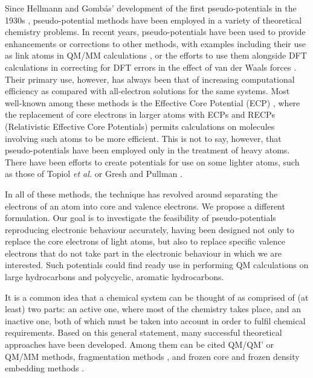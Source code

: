 \documentclass[12pt]{article}
\begin{document}
Since Hellmann and Gomb\'as' development of the first pseudo-potentials in the 1930s \cite{hellmann_1935, gombas_1935}, pseudo-potential methods have been employed in a variety of theoretical chemistry problems. In recent years, pseudo-potentials have been used to provide enhancements or corrections to other methods, with examples including their use as link atoms in QM/MM calculations \cite{chung_oniom_2015,
ihrig_specific_2011,
zhang_pseudobond_1998,
dilabio_simple_2002,
dilabio_efficient_2005,
gao_generalized_1998,
assfeld_quantum_1996,
jacob_calculation_2006,
von_lilienfeld_variational_2004,
von_lilienfeld_performance_2005,
von_lilienfeld_optimization_2004,
goedecker_separable_1996,
hartwigsen_relativistic_1998,
singh_combined_1986,
zhang_pseudobond_1998-1,
zhang_improved_2004,
parks_pseudobond_2008,
dilabio_simple_2002-1,
hitzenberger_optimizing_2016,
hitzenberger_probing_2015,
collins_energy-based_2015,
pezeshki_recent_2015,
von_lilienfeld_force_2013}, or the efforts to use them alongside DFT calculations in correcting for DFT errors in the effect of van der Waals forces \cite{dilabio_2008}. Their primary use, however, has always been that of increasing computational efficiency as compared with all-electron solutions for the same systems. Most well-known among these methods is the Effective Core Potential (ECP) \cite{dolg_2000}, where the replacement of core electrons in larger atoms with ECPs and RECPs (Relativistic Effective Core Potentials) permits calculations on molecules involving such atoms to be more efficient. This is not to say, however, that pseudo-potentials have been employed only in the treatment of heavy atoms. There have been efforts to create potentials for use on some lighter atoms, such as those of Topiol \emph{et al.} or Gresh and Pullman \cite{topiol_1976, gresh_1978}. 

In all of these methods, the technique has revolved around separating the electrons of an atom into core and valence electrons. We propose a different formulation. Our goal is to investigate the feasibility of pseudo-potentials reproducing electronic behaviour accurately, having been designed not only to replace the core electrons of light atoms, but also to replace specific valence electrons that do not take part in the electronic behaviour in which we are interested. Such potentials could find ready use in performing QM calculations on large hydrocarbons and polycyclic, aromatic hydrocarbons.

It is a common idea that a chemical system can be thought of as comprised of (at least) 
two parts:
an active one, where most of the chemistry takes place, and an inactive one, both of which must be taken into account in order to fulfil chemical requirements.
Based on this general statement, many successful theoretical approaches have been developed. Among them can be cited QM/QM' or QM/MM methods, fragmentation methods 
\cite{gordon_effective_2001,
steinmann_effective_2012}, and frozen core and frozen density embedding methods \cite{ASSFELD1996100, wesolowski_frozen-density_2015}.
\end{document}
